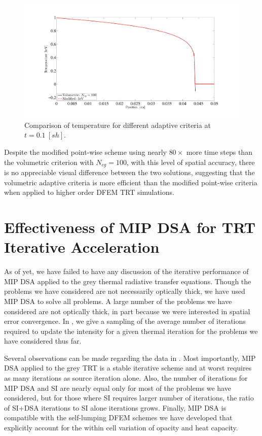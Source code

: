 \begin{figure}[!htp]
\centering
\includegraphics[width=16cm,trim=2in  0.4in 0.5in 0.75in,clip=true]{chapter6_grey_radtran/Dissertation_Data/100C_Physical_Marshak_Wave_Temperature_Adaptive_Comparison_Final.pdf}
\caption{Comparison of temperature for different adaptive criteria at $t=0.1~[sh]$.}
\label{fig:time_difference_temperature}
\end{figure}
Despite the modified point-wise scheme using nearly $80\times$ more time steps than the volumetric criterion with $N_{cg}=100$, with this level of spatial accuracy, there is no appreciable visual difference between the two solutions, suggesting that the volumetric adaptive criteria is more efficient than the modified point-wise criteria when applied to higher order DFEM TRT simulations.

\newpage

\section{Effectiveness of MIP DSA for TRT Iterative Acceleration}
\label{sec:mip_results}

As of yet, we have failed to have any discussion of the iterative performance of MIP DSA applied to the grey thermal radiative transfer equations.
Though the problems we have considered are not necessarily optically thick, we have used MIP DSA to solve all problems.
A large number of the problems we have considered are not optically thick, in part because we were interested in spatial error convergence.
In , we give a sampling of the average number of iterations required to update the intensity for a given thermal iteration for the problems we have considered thus far.

Several observations can be made regarding the data in .  
Most importantly, MIP DSA applied to the grey TRT is a stable iterative scheme and at worst requires as many iterations as source iteration alone.
Also, the number of iterations for MIP DSA and SI are nearly equal only for most of the problems we have considered, but for those where SI requires larger number of iterations, the ratio of SI+DSA iterations to SI alone iterations grows.
Finally, MIP DSA is compatible with the self-lumping DFEM schemes we have developed that explicitly account for the within cell variation of opacity and heat capacity.

